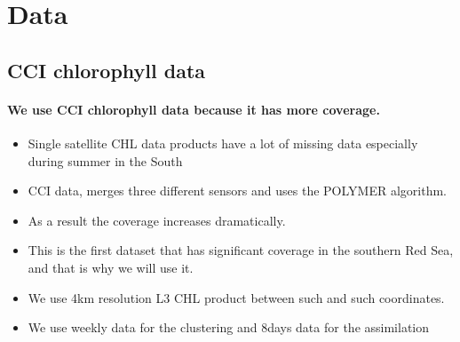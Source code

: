 \newcommand{\cov}{\text{cov}}

\newcommand{\0}{\mathbf{0}}

\newcommand{\C}{\mathbf{C}}
\newcommand{\X}{\mathbf{X}}
\newcommand{\U}{\mathbf{U}}
\renewcommand{\V}{\mathbf{V}}
\newcommand{\M}{\mathbf{M}}
\newcommand{\Q}{\mathbf{Q}}
\renewcommand{\H}{\mathbf{H}}
\newcommand{\I}{\mathbf{I}}
\newcommand{\R}{\mathbf{R}}
\renewcommand{\P}{\mathbf{P}}
\renewcommand{\L}{\mathbf{L}}

\renewcommand{\a}{\mathbf{a}}
\newcommand{\h}{\mathbf{h}}
\renewcommand{\r}{\mathbf{r}}
\newcommand{\x}{\mathbf{x}}
\renewcommand{\k}{\mathbf{k}}
\newcommand{\y}{\mathbf{y}}
\newcommand{\z}{\mathbf{z}}

\newcommand{\SSigma}{\mathbf{\Sigma}}
\newcommand{\GGamma}{\mathbf{\Gamma}}

\newcommand{\ttheta}{\boldsymbol\theta}
\newcommand{\eeta}{\boldsymbol\eta}
\newcommand{\vvarepsilon}{\boldsymbol\varepsilon}
\newcommand{\xxi}{\boldsymbol\xi}
\newcommand{\mmu}{\boldsymbol\mu}

\section{Data}

\subsection{CCI chlorophyll data}

\paragraph{We use CCI chlorophyll data because it has more coverage.}

\begin{itemize}
	\item Single satellite CHL data products have a lot of missing data
especially during summer in the South
  \item CCI data, merges three different sensors and uses the POLYMER
algorithm.
  \item As a result the coverage increases dramatically.
  \item This is the first dataset that has significant coverage in
the southern Red Sea, and that is why we will use it.
  \item We use 4km resolution L3 CHL product between such and such
coordinates.
  \item We use weekly data for the clustering and 8days data for
the assimilation
\end{itemize}

